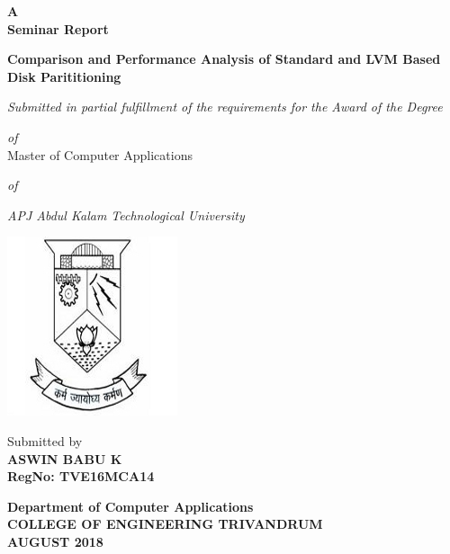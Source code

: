 \begin{titlepage}
\begin{center}
\textbf{ A  }\\
\vspace{0.35cm}
\textbf{ Seminar Report}\\
\vspace{0.55cm}

\textbf{\Large{Comparison and Performance Analysis of Standard and LVM Based Disk Parititioning}}\\
\vspace{0.2cm}

\normalsize
\vspace{0.5cm}
\emph{Submitted in partial fulfillment of the requirements for the Award of the Degree}\\
\vspace{0.35cm}

\emph{of}\\
\vspace{0.35cm}
Master of Computer Applications\\
\vspace{0.35cm}

\emph{of}\\
\vspace{0.35cm}

\emph{ {APJ Abdul Kalam Technological University} }\\
\normalsize
\vspace{0.5cm}

\includegraphics[height=0.30\textwidth]{./logo}\\
\vspace{0.3cm}

Submitted by\\
\vspace{0.3cm}
\textbf{ASWIN BABU K}\\
\vspace{0.5cm}
\textbf{RegNo: TVE16MCA14}\\
\vspace{1.8cm}

\normalsize
\textbf{Department of Computer Applications}\\[0.3cm]
\textbf{COLLEGE OF ENGINEERING TRIVANDRUM}\\[0.4cm]
\textbf{AUGUST 2018}\\
\end{center}
\end{titlepage}

